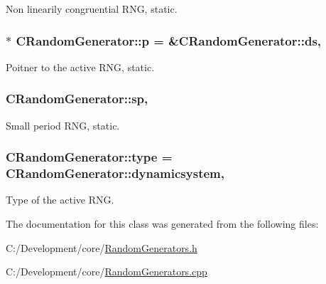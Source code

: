 Non linearily congruential R\-N\-G, static. 

\hypertarget{class_c_random_generator_acbfaff7d68bd7dd1e5e2887f6052c7b1}{
\subsubsection[{p}]{ $\ast$ C\-Random\-Generator\-::p = \&{\bf C\-Random\-Generator\-::ds}\hspace{0.3cm}{\ttfamily [static]}, {\ttfamily [private]}}}\label{class_c_random_generator_acbfaff7d68bd7dd1e5e2887f6052c7b1}


Poitner to the active R\-N\-G, static. 

\hypertarget{class_c_random_generator_a08f99df22f49da96daeed3e60a5b58cb}{
\subsubsection[{sp}]{ C\-Random\-Generator\-::sp\hspace{0.3cm}{\ttfamily [static]}, {\ttfamily [private]}}}\label{class_c_random_generator_a08f99df22f49da96daeed3e60a5b58cb}


Small period R\-N\-G, static. 

\hypertarget{class_c_random_generator_ad7cabc0ed9cdca955d2c6db269531354}{
\subsubsection[{type}]{ C\-Random\-Generator\-::type = {\bf C\-Random\-Generator\-::dynamicsystem}\hspace{0.3cm}{\ttfamily [static]}, {\ttfamily [private]}}}\label{class_c_random_generator_ad7cabc0ed9cdca955d2c6db269531354}


Type of the active R\-N\-G. 



The documentation for this class was generated from the following files\-:\begin{DoxyCompactItemize}
\item 
C\-:/\-Development/core/\hyperlink{_random_generators_8h}{Random\-Generators.\-h}\item 
C\-:/\-Development/core/\hyperlink{_random_generators_8cpp}{Random\-Generators.\-cpp}\end{DoxyCompactItemize}
